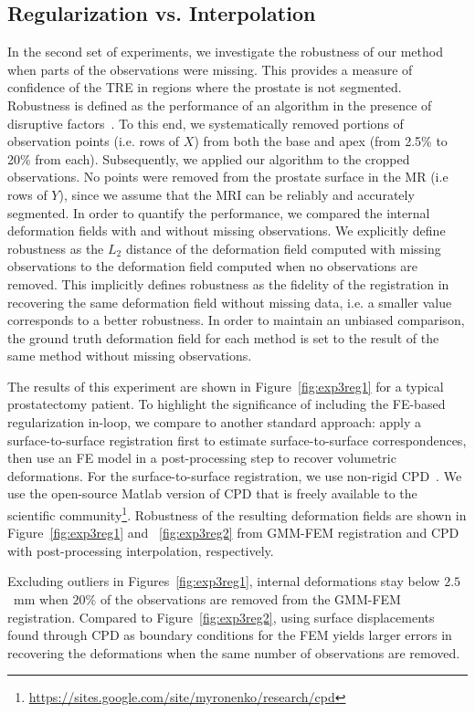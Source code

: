 \documentclass[journal]{IEEEtran}
\begin{document}
\subsection{Regularization vs. Interpolation}\label{sec:exp2}
In the second set of experiments, we investigate the robustness of our method when parts of the observations were missing. This provides a measure of confidence of the TRE in regions where the prostate is not segmented. Robustness is defined as the performance of an algorithm in the presence of disruptive factors~\cite{Jannin02a}. To this end, we systematically removed portions of observation points (i.e. rows of $X$) from both the base and apex (from 2.5\% to 20\% from each). Subsequently, we applied our algorithm to the cropped observations. No points were removed from the prostate surface in the MR (i.e rows of $Y$), since we assume that the MRI can be reliably and accurately segmented. In order to quantify the performance, we compared the internal deformation fields with and without missing observations. We explicitly define robustness as the $L_2$ distance of the deformation field computed with missing observations to the deformation field computed when no observations are removed. This implicitly defines robustness as the fidelity of the registration in recovering the same deformation field without missing data, i.e. a smaller value corresponds to a better robustness. In order to maintain an unbiased comparison, the ground truth deformation field for each method is set to the result of the same method without missing observations.

The results of this experiment are shown in Figure~\ref{fig:exp3reg1} for a typical prostatectomy patient. To highlight the significance of including the FE-based regularization in-loop, we compare to another standard approach: apply a surface-to-surface registration first to estimate surface-to-surface correspondences, then use an FE model in a post-processing step to recover volumetric deformations. For the surface-to-surface registration, we use non-rigid CPD~\cite{Myronenko10a}. We use the open-source Matlab version of CPD that is freely available to the scientific community\footnote{\url{https://sites.google.com/site/myronenko/research/cpd}}. Robustness of the resulting deformation fields are shown in Figure~\ref{fig:exp3reg1} and ~\ref{fig:exp3reg2} from GMM-FEM registration and CPD with post-processing interpolation, respectively.

Excluding outliers in Figures~\ref{fig:exp3reg1}, internal deformations stay below $2.5$~mm when $20\%$ of the observations are removed from the GMM-FEM registration. Compared to Figure~\ref{fig:exp3reg2}, using surface displacements found through CPD as boundary conditions for the FEM yields larger errors in recovering the deformations when the same number of observations are removed.
\end{document}
